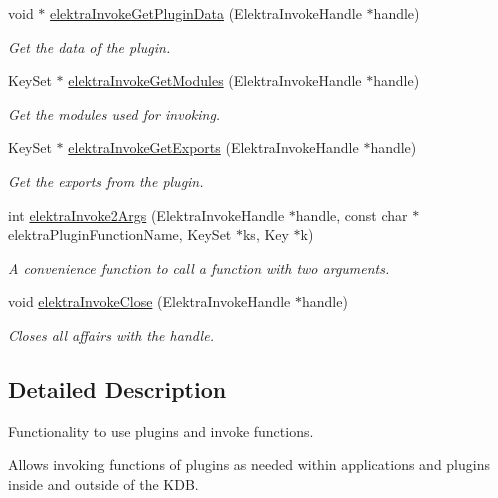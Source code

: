 \begin{DoxyCompactItemize}
void $\ast$ \hyperlink{group__invoke_gac615e211a4d3c77addfa18152c274345}{elektra\+Invoke\+Get\+Plugin\+Data} (Elektra\+Invoke\+Handle $\ast$handle)
\begin{DoxyCompactList}\small\item\em Get the data of the plugin. \end{DoxyCompactList}\item 
Key\+Set $\ast$ \hyperlink{group__invoke_gaf3564011b52e96c9754a7b9bc41ea478}{elektra\+Invoke\+Get\+Modules} (Elektra\+Invoke\+Handle $\ast$handle)
\begin{DoxyCompactList}\small\item\em Get the modules used for invoking. \end{DoxyCompactList}\item 
Key\+Set $\ast$ \hyperlink{group__invoke_ga6ab386aba337d8d3fd7978070d613efe}{elektra\+Invoke\+Get\+Exports} (Elektra\+Invoke\+Handle $\ast$handle)
\begin{DoxyCompactList}\small\item\em Get the exports from the plugin. \end{DoxyCompactList}\item 
int \hyperlink{group__invoke_gaa257d93399c60f73c611205bbfa7c9a0}{elektra\+Invoke2\+Args} (Elektra\+Invoke\+Handle $\ast$handle, const char $\ast$elektra\+Plugin\+Function\+Name, Key\+Set $\ast$ks, Key $\ast$k)
\begin{DoxyCompactList}\small\item\em A convenience function to call a function with two arguments. \end{DoxyCompactList}\item 
void \hyperlink{group__invoke_ga511b84e5cea7dbd2b23c4da5c8ff5ae3}{elektra\+Invoke\+Close} (Elektra\+Invoke\+Handle $\ast$handle)
\begin{DoxyCompactList}\small\item\em Closes all affairs with the handle. \end{DoxyCompactList}\end{DoxyCompactItemize}


\subsection{Detailed Description}
Functionality to use plugins and invoke functions. 

Allows invoking functions of plugins as needed within applications and plugins inside and outside of the K\+DB.

